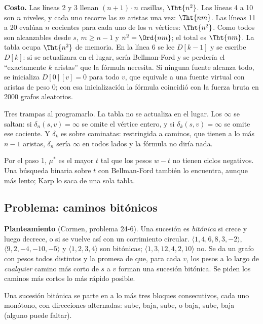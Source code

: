 \documentclass[11pt,letterpaper]{article}
\begin{document}
\textbf{Costo.} Las líneas 2 y 3 llenan $(n + 1) \cdot n$ casillas,
$\Tht{n^2}$. Las líneas 4 a 10 son $n$ niveles, y cada uno recorre las
$m$ aristas una vez: $\Tht{nm}$. Las líneas 11 a 20 evalúan $n$
cocientes para cada uno de los $n$ vértices: $\Tht{n^2}$. Como todos
son alcanzables desde $s$, $m \ge n - 1$ y $n^2 = \Ord{nm}$; el total
es $\Tht{nm}$. La tabla ocupa $\Tht{n^2}$ de memoria. En la línea 6
se lee $D[k-1]$ y se escribe $D[k]$: si se actualizara en el lugar,
sería Bellman-Ford y se perdería el ``exactamente $k$ aristas'' que
la fórmula necesita. Si ninguna fuente alcanza todo, se inicializa
$D[0][v] = 0$ para todo $v$, que equivale a una fuente virtual con
aristas de peso $0$; con esa inicialización la fórmula coincidió con
la fuerza bruta en 2000 grafos aleatorios.

\begin{ojo}
  Tres trampas al programarlo. La tabla no se actualiza en el lugar.
  Los $\infty$ se saltan: si $\delta_n(s, v) = \infty$ se omite el
  vértice entero, y si $\delta_k(s, v) = \infty$ se omite ese
  cociente. Y $\delta_k$ es sobre caminatas: restringida a caminos,
  que tienen a lo más $n - 1$ aristas, $\delta_n$ sería $\infty$ en
  todos lados y la fórmula no diría nada.
\end{ojo}

Por el paso 1, $\mu^*$ es el mayor $t$ tal que los pesos $w - t$ no
tienen ciclos negativos. Una búsqueda binaria sobre $t$ con
Bellman-Ford también lo encuentra, aunque más lento; Karp lo saca de
una sola tabla.


\subsection*{Problema: caminos bitónicos}

\textbf{Planteamiento} (Cormen, problema 24-6). Una sucesión es
\emph{bitónica} si crece y luego decrece, o si se vuelve así con un
corrimiento circular. $\langle 1, 4, 6, 8, 3, -2 \rangle$,
$\langle 9, 2, -4, -10, -5 \rangle$ y $\langle 1, 2, 3, 4 \rangle$
son bitónicas; $\langle 1, 3, 12, 4, 2, 10 \rangle$ no. Se da un grafo
con pesos todos distintos y la promesa de que, para cada $v$, los pesos
a lo largo de \emph{cualquier} camino más corto de $s$ a $v$ forman
una sucesión bitónica. Se piden los caminos más cortos lo más rápido
posible.

\begin{lema}\label{lem:caminos-bitonica-corridas}
  Una sucesión bitónica se parte en a lo más tres bloques
  consecutivos, cada uno monótono, con direcciones alternadas: sube,
  baja, sube, o baja, sube, baja (alguno puede faltar).
\end{lema}
\end{document}

